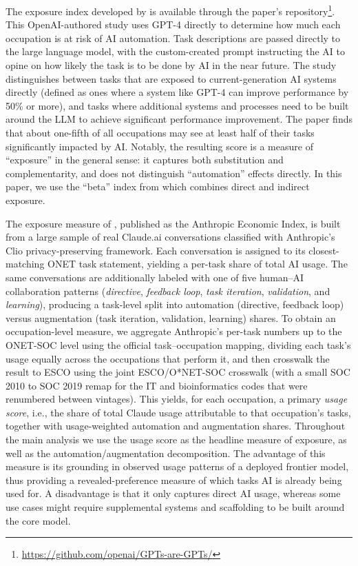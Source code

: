 \documentclass[11pt]{article}
\begin{document}
The exposure index developed by \citet{eloundou_gpts_2023} is available through the paper's repository\footnote{\url{https://github.com/openai/GPTs-are-GPTs/}}. This OpenAI-authored study uses GPT-4 directly to determine how much each occupation is at risk of AI automation. Task descriptions are passed directly to the large language model, with the custom-created prompt instructing the AI to opine on how likely the task is to be done by AI in the near future. The study distinguishes between tasks that are exposed to current-generation AI systems directly (defined as ones where a system like GPT-4 can improve performance by 50\% or more), and tasks where additional systems and processes need to be built around the LLM to achieve significant performance improvement. The paper finds that about one-fifth of all occupations may see at least half of their tasks significantly impacted by AI. Notably, the resulting score is a measure of ``exposure'' in the general sense: it captures both substitution and complementarity, and does not distinguish ``automation'' effects directly. In this paper, we use the ``beta'' index from \citet{eloundou_gpts_2023} which combines direct and indirect exposure.

The exposure measure of \citet{handa2025economic}, published as the Anthropic Economic Index, is built from a large sample of real Claude.ai conversations classified with Anthropic's Clio privacy-preserving framework. Each conversation is assigned to its closest-matching ONET task statement, yielding a per-task share of total AI usage. The same conversations are additionally labeled with one of five human--AI collaboration patterns (\emph{directive}, \emph{feedback loop}, \emph{task iteration}, \emph{validation}, and \emph{learning}), producing a task-level split into automation (directive, feedback loop) versus augmentation (task iteration, validation, learning) shares. To obtain an occupation-level measure, we aggregate Anthropic's per-task numbers up to the ONET-SOC level using the official task--occupation mapping, dividing each task's usage equally across the occupations that perform it, and then crosswalk the result to ESCO using the joint ESCO/O*NET-SOC crosswalk (with a small SOC 2010 to SOC 2019 remap for the IT and bioinformatics codes that were renumbered between vintages). This yields, for each occupation, a primary \emph{usage score}, i.e., the share of total Claude usage attributable to that occupation's tasks, together with usage-weighted automation and augmentation shares. Throughout the main analysis we use the usage score as the headline measure of exposure, as well as the automation/augmentation decomposition. The advantage of this measure is its grounding in observed usage patterns of a deployed frontier model, thus providing a revealed-preference measure of which tasks AI is already being used for. A disadvantage is that it only captures direct AI usage, whereas some use cases might require supplemental systems and scaffolding to be built around the core model.
\end{document}
